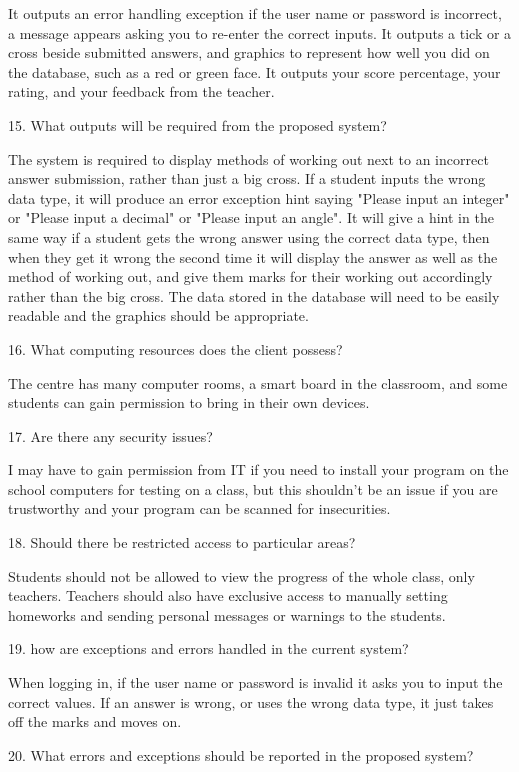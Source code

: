 It outputs an error handling exception if the user name or password is incorrect, a message appears asking you to re-enter the correct inputs. It outputs a tick or a cross beside submitted answers, and graphics to represent how well you did on the database, such as a red or green face. It outputs your score percentage, your rating, and your feedback from the teacher. 

15. What outputs will be required from the proposed system?

The system is required to display methods of working out next to an incorrect answer submission, rather than just a big cross. If a student inputs the wrong data type, it will produce an error exception hint saying "Please input an integer" or "Please input a decimal" or "Please input an angle". It will give a hint in the same way if a student gets the wrong answer using the correct data type, then when they get it wrong the second time it will display the answer as well as the method of working out, and give them marks for their working out accordingly rather than the big cross. The data stored in the database will need to be easily readable and the graphics should be appropriate.

16. What computing resources does the client possess?

The centre has many computer rooms, a smart board in the classroom, and some students can gain permission to bring in their own devices.

17. Are there any security issues?

I may have to gain permission from IT if you need to install your program on the school computers for testing on a class, but this shouldn't be an issue if you are trustworthy and your program can be scanned for insecurities.

18. Should there be restricted access to particular areas?

Students should not be allowed to view the progress of the whole class, only teachers. Teachers should also have exclusive access to manually setting homeworks and sending personal messages or warnings to the students. 

19. how are exceptions and errors handled in the current system?

When logging in, if the user name or password is invalid it asks you to input the correct values. If an answer is wrong, or uses the wrong data type, it just takes off the marks and moves on.

20. What errors and exceptions should be reported in the proposed system?

